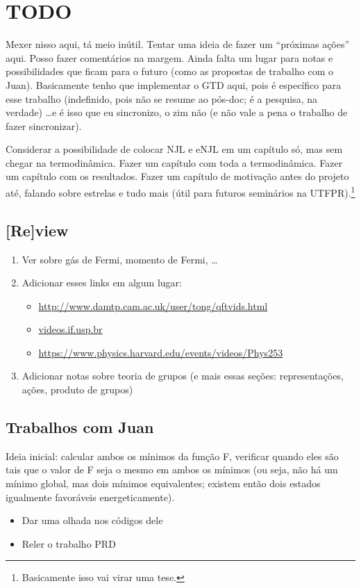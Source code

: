 \chapter{TODO}

Mexer nisso aqui, tá meio inútil. Tentar uma ideia de fazer um ``próximas ações'' aqui. Posso fazer comentários na margem. Ainda falta um lugar para notas e possibilidades que ficam para o futuro (como as propostas de trabalho com o Juan). Basicamente tenho que implementar o GTD aqui, pois é específico para esse trabalho (indefinido, pois não se resume ao pós-doc; é a pesquisa, na verdade) \dots e é isso que eu sincronizo, o zim não (e não vale a pena o trabalho de fazer sincronizar).

Considerar a possibilidade de colocar NJL e eNJL em um capítulo só, mas sem chegar na termodinâmica. Fazer um capítulo com toda a termodinâmica. Fazer um capítulo com os resultados. Fazer um capítulo de motivação antes do projeto até, falando sobre estrelas e tudo mais (útil para futuros seminários na UTFPR).\footnote{Basicamente isso vai virar uma tese.}

\section{[Re]view}

\begin{enumerate}
\item Ver sobre gás de Fermi, momento de Fermi, \dots
\item Adicionar esses links em algum lugar:
	\begin{itemize}
		\item \url{http://www.damtp.cam.ac.uk/user/tong/qftvids.html}
		\item \url{videos.if.usp.br}
		\item \url{https://www.physics.harvard.edu/events/videos/Phys253}
	\end{itemize}
\item Adicionar notas sobre teoria de grupos (e mais essas seções: representações, ações, produto de grupos)
\end{enumerate}

\section{Trabalhos com Juan}

Ideia inicial: calcular ambos os mínimos da função F, verificar quando eles são tais que o valor de F seja o mesmo em ambos os mínimos (ou seja, não há um mínimo global, mas dois mínimos equivalentes; existem então dois estados igualmente favoráveis energeticamente). 

\begin{itemize}
	\item Dar uma olhada nos códigos dele
	\item Reler o trabalho PRD
\end{itemize}